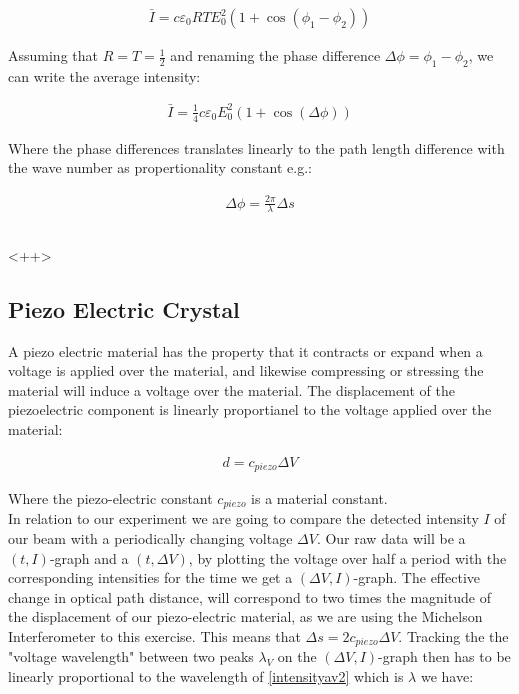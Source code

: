 \begin{align}
\bar{I}=c\varepsilon_0 RTE_{0}^2(1+\cos(\phi_1-\phi_2))
\label{intensityav1}
\end{align}

Assuming that $R=T=\frac{1}{2}$ and renaming the phase difference $\Delta \phi=\phi_1-\phi_2$, we can write the average intensity:

\begin{align}
\bar{I}=\frac{1}{4}c\varepsilon_0 E_{0}^2(1+\cos(\Delta \phi))
\label{intensityav2}
\end{align}

Where the phase differences translates linearly to the path length difference with the wave number as propertionality constant e.g.:

\begin{align}
\Delta \phi = \frac{2\pi}{\lambda}\Delta s
\label{phasetrans}
\end{align}



\subsection{}<++>

\subsection{Piezo Electric Crystal}

A piezo electric material has the property that it contracts or expand when a voltage is applied over the material, and likewise compressing or stressing the material will induce a voltage over the material. The displacement of the piezoelectric component is linearly proportianel to the voltage applied over the material:

\begin{align}
d = c_{piezo}\Delta V
\label{piezodisp}
\end{align}

Where the piezo-electric constant $c_{piezo}$ is a material constant.\\

In relation to our experiment we are going to compare the detected intensity $I$ of our beam with a periodically changing voltage $\Delta V$. Our raw data will be a $(t,I)$-graph and a $(t, \Delta V)$, by plotting the voltage over half a period with the corresponding intensities for the time we get a $(\Delta V,I)$-graph. The effective change in optical path distance, will correspond to two times the magnitude of the displacement of our piezo-electric material, as we are using the Michelson Interferometer to this exercise. This means that $\Delta s = 2 c_{piezo} \Delta V$. Tracking the the "voltage wavelength" between two peaks $\lambda_V$ on the $(\Delta V,I)$-graph then has to be linearly proportional to the wavelength of \ref{intensityav2} which is $\lambda$ we have:

